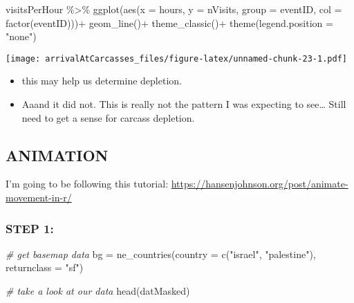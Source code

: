 \documentclass[
]{article}
\newenvironment{Shaded}{\begin{snugshade}}{\end{snugshade}}
\newcommand{\AttributeTok}[1]{\textcolor[rgb]{0.77,0.63,0.00}{#1}}
\newcommand{\CommentTok}[1]{\textcolor[rgb]{0.56,0.35,0.01}{\textit{#1}}}
\newcommand{\FunctionTok}[1]{\textcolor[rgb]{0.00,0.00,0.00}{#1}}
\newcommand{\NormalTok}[1]{#1}
\newcommand{\OtherTok}[1]{\textcolor[rgb]{0.56,0.35,0.01}{#1}}
\newcommand{\SpecialCharTok}[1]{\textcolor[rgb]{0.00,0.00,0.00}{#1}}
\newcommand{\StringTok}[1]{\textcolor[rgb]{0.31,0.60,0.02}{#1}}
\begin{document}
\begin{Shaded}
\begin{Highlighting}[]
\NormalTok{visitsPerHour }\SpecialCharTok{\%\textgreater{}\%}
  \FunctionTok{ggplot}\NormalTok{(}\FunctionTok{aes}\NormalTok{(}\AttributeTok{x =}\NormalTok{ hours, }\AttributeTok{y =}\NormalTok{ nVisits, }\AttributeTok{group =}\NormalTok{ eventID, }\AttributeTok{col =} \FunctionTok{factor}\NormalTok{(eventID)))}\SpecialCharTok{+}
  \FunctionTok{geom\_line}\NormalTok{()}\SpecialCharTok{+}
  \FunctionTok{theme\_classic}\NormalTok{()}\SpecialCharTok{+}
  \FunctionTok{theme}\NormalTok{(}\AttributeTok{legend.position =} \StringTok{"none"}\NormalTok{)}
\end{Highlighting}
\end{Shaded}

\texttt{[image: arrivalAtCarcasses\_files/figure-latex/unnamed-chunk-23-1.pdf]}

\begin{itemize}
\item
  this may help us determine depletion.
\item
  Aaand it did not. This is really not the pattern I was expecting to
  see\ldots{} Still need to get a sense for carcass depletion.
\end{itemize}

\hypertarget{animation}{%
\subsection{ANIMATION}\label{animation}}

I'm going to be following this tutorial:
\url{https://hansenjohnson.org/post/animate-movement-in-r/}

\hypertarget{step-1}{%
\subsubsection{STEP 1:}\label{step-1}}

\begin{Shaded}
\begin{Highlighting}[]
\CommentTok{\# get basemap data}
\NormalTok{bg }\OtherTok{=} \FunctionTok{ne\_countries}\NormalTok{(}\AttributeTok{country =} \FunctionTok{c}\NormalTok{(}\StringTok{"israel"}\NormalTok{, }\StringTok{"palestine"}\NormalTok{), }\AttributeTok{returnclass =} \StringTok{"sf"}\NormalTok{)}

\CommentTok{\# take a look at our data}
\FunctionTok{head}\NormalTok{(datMasked)}
\end{Highlighting}
\end{Shaded}
\end{document}
